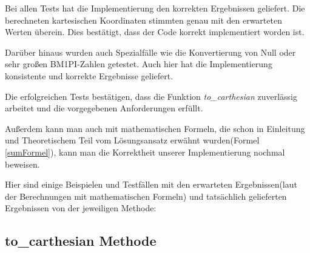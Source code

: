 \documentclass[course=erap]{aspdoc}
\begin{document}
    Bei allen Tests hat die Implementierung den korrekten Ergebnissen geliefert. Die berechneten kartesischen Koordinaten stimmten genau mit den erwarteten Werten überein. Dies bestätigt, dass der Code korrekt implementiert worden ist.

    Darüber hinaus wurden auch Spezialfälle wie die Konvertierung von Null oder sehr großen BM1PI-Zahlen getestet. Auch hier hat die Implementierung konsistente und korrekte Ergebnisse geliefert.

    Die erfolgreichen Tests bestätigen, dass die Funktion \textit{to\_carthesian} zuverlässig arbeitet und die vorgegebenen Anforderungen erfüllt.

    Außerdem kann man auch mit mathematischen Formeln, die schon in Einleitung und Theoretischem Teil vom Lösungsansatz erwähnt wurden(Formel \ref{sumFormel}), kann man die Korrektheit unserer Implementierung nochmal beweisen.

    Hier sind einige Beispielen und Testfällen mit den erwarteten Ergebnissen(laut der Berechnungen mit mathematischen Formeln) und tatsächlich gelieferten Ergebnissen von der jeweiligen Methode:
    \subsection{to\_carthesian Methode}

\end{document}
